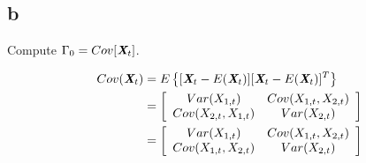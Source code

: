 \subsection{b} 
\label{section_1_b}
Compute $\Gamma_0 = Cov[\textbf{\em X}_t]$.

\begin{solution}

\begin{equation}
\begin{aligned}
Cov(\textbf{\em X}_t) & = E\left\{[\textbf{\em X}_t-E(\textbf{\em X}_t)][\textbf{\em X}_t-E(\textbf{\em X}_t)]^T\right\} \\
									& =\left[\begin{array}{cc} Var(X_{1,t}) & Cov(X_{1,t},X_{2,t}) \\ Cov(X_{2,t},X_{1,t}) & Var(X_{2,t}) \end{array}\right] \\
									& =\left[\begin{array}{cc} Var(X_{1,t}) & Cov(X_{1,t},X_{2,t}) \\ Cov(X_{1,t},X_{2,t}) & Var(X_{2,t}) \end{array}\right] 
\end{aligned}
\end{equation}


\end{solution}
